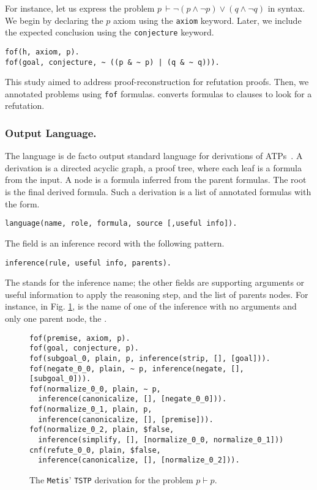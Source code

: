 \documentclass[../main.tex]{subfiles}
\begin{document}
For instance, let us express the problem
$p\, \vdash \neg (p \wedge \neg p) ∨ (q \wedge \neg q)$
in \TPTP syntax. We begin by declaring the $p$ axiom using the \verb!axiom!
keyword. Later, we include the expected conclusion using the \verb!conjecture! keyword.

\begin{verbatim}
fof(h, axiom, p).
fof(goal, conjecture, ~ ((p & ~ p) | (q & ~ q))).
\end{verbatim}

This study aimed to address proof-reconstruction for refutation
proofs. Then, we annotated  problems using \verb!fof! formulas.
\Metis converts  formulas to  clauses to look for a
refutation.

\subsubsection{Output Language.}
\label{ssec:output-language}

The \TSTP language is de facto output standard language
for derivations of ATPs~\cite{Sutcliffe-Schulz-Claessen-VanGelder-2006}.
A \TSTP derivation is a directed acyclic graph, a proof tree,
where each leaf is a formula from the \TPTP input. A node is a formula
inferred from the parent formulas. The root is the final derived formula.
Such a derivation is a list of annotated formulas with the form.

\begin{verbatim}
language(name, role, formula, source [,useful info]).
\end{verbatim}

The  field is an inference record with the following
pattern.

\begin{verbatim}
inference(rule, useful info, parents).
\end{verbatim}

The  stands for the inference name; the other fields are
supporting arguments or useful information to apply the reasoning
step, and the list of parents nodes. For instance, in Fig.
\ref{fig:metis-proof-tstp}, \strip is the name of one of the
inference with no arguments and only one parent node, the
.

\begin{figure}
\begin{verbatim}
fof(premise, axiom, p).
fof(goal, conjecture, p).
fof(subgoal_0, plain, p, inference(strip, [], [goal])).
fof(negate_0_0, plain, ~ p, inference(negate, [], [subgoal_0])).
fof(normalize_0_0, plain, ∼ p,
  inference(canonicalize, [], [negate_0_0])).
fof(normalize_0_1, plain, p,
  inference(canonicalize, [], [premise])).
fof(normalize_0_2, plain, $false,
  inference(simplify, [], [normalize_0_0, normalize_0_1]))
cnf(refute_0_0, plain, $false,
  inference(canonicalize, [], [normalize_0_2])).
\end{verbatim}
\caption{The \texttt{Metis}' \texttt{TSTP} derivation for the
problem $p\vdash p$.}
\label{fig:metis-proof-tstp}
\end{figure}
\end{document}
